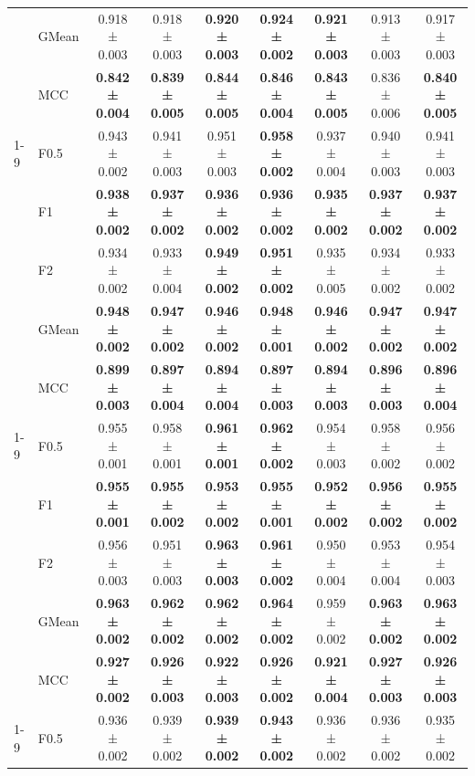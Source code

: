 \begin{table}[H]
{\begin{tabular}{llccccccc}
 & GMean & 0.918 ± 0.003 & 0.918 ± 0.003 & \textbf{0.920 ± 0.003} & \textbf{0.924 ± 0.002} & \textbf{0.921 ± 0.003} & 0.913 ± 0.003 & 0.917 ± 0.003 \\
 & MCC & \textbf{0.842 ± 0.004} & \textbf{0.839 ± 0.005} & \textbf{0.844 ± 0.005} & \textbf{0.846 ± 0.004} & \textbf{0.843 ± 0.005} & 0.836 ± 0.006 & \textbf{0.840 ± 0.005} \\
\cline{1-9}
\multirow[t]{5}{*}{RandomForest} & F0.5 & 0.943 ± 0.002 & 0.941 ± 0.003 & 0.951 ± 0.003 & \textbf{0.958 ± 0.002} & 0.937 ± 0.004 & 0.940 ± 0.003 & 0.941 ± 0.003 \\
 & F1 & \textbf{0.938 ± 0.002} & \textbf{0.937 ± 0.002} & \textbf{0.936 ± 0.002} & \textbf{0.936 ± 0.002} & \textbf{0.935 ± 0.002} & \textbf{0.937 ± 0.002} & \textbf{0.937 ± 0.002} \\
 & F2 & 0.934 ± 0.002 & 0.933 ± 0.004 & \textbf{0.949 ± 0.002} & \textbf{0.951 ± 0.002} & 0.935 ± 0.005 & 0.934 ± 0.002 & 0.933 ± 0.002 \\
 & GMean & \textbf{0.948 ± 0.002} & \textbf{0.947 ± 0.002} & \textbf{0.946 ± 0.002} & \textbf{0.948 ± 0.001} & \textbf{0.946 ± 0.002} & \textbf{0.947 ± 0.002} & \textbf{0.947 ± 0.002} \\
 & MCC & \textbf{0.899 ± 0.003} & \textbf{0.897 ± 0.004} & \textbf{0.894 ± 0.004} & \textbf{0.897 ± 0.003} & \textbf{0.894 ± 0.003} & \textbf{0.896 ± 0.003} & \textbf{0.896 ± 0.004} \\
\cline{1-9}
\multirow[t]{5}{*}{TabICL} & F0.5 & 0.955 ± 0.001 & 0.958 ± 0.001 & \textbf{0.961 ± 0.001} & \textbf{0.962 ± 0.002} & 0.954 ± 0.003 & 0.958 ± 0.002 & 0.956 ± 0.002 \\
 & F1 & \textbf{0.955 ± 0.001} & \textbf{0.955 ± 0.002} & \textbf{0.953 ± 0.002} & \textbf{0.955 ± 0.001} & \textbf{0.952 ± 0.002} & \textbf{0.956 ± 0.002} & \textbf{0.955 ± 0.002} \\
 & F2 & 0.956 ± 0.003 & 0.951 ± 0.003 & \textbf{0.963 ± 0.003} & \textbf{0.961 ± 0.002} & 0.950 ± 0.004 & 0.953 ± 0.004 & 0.954 ± 0.003 \\
 & GMean & \textbf{0.963 ± 0.002} & \textbf{0.962 ± 0.002} & \textbf{0.962 ± 0.002} & \textbf{0.964 ± 0.002} & 0.959 ± 0.002 & \textbf{0.963 ± 0.002} & \textbf{0.963 ± 0.002} \\
 & MCC & \textbf{0.927 ± 0.002} & \textbf{0.926 ± 0.003} & \textbf{0.922 ± 0.003} & \textbf{0.926 ± 0.002} & \textbf{0.921 ± 0.004} & \textbf{0.927 ± 0.003} & \textbf{0.926 ± 0.003} \\
\cline{1-9}
\multirow[t]{5}{*}{TabM} & F0.5 & 0.936 ± 0.002 & 0.939 ± 0.002 & \textbf{0.939 ± 0.002} & \textbf{0.943 ± 0.002} & 0.936 ± 0.002 & 0.936 ± 0.002 & 0.935 ± 0.002 \\

\end{tabular}}
\end{table}
